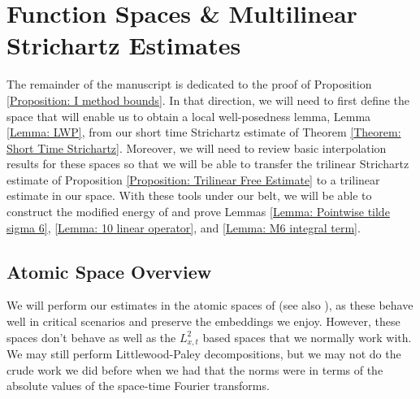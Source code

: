 \documentclass[12pt, letterpaper]{amsart}
\begin{document}
\section{Function Spaces \& Multilinear Strichartz Estimates}\label{Section: I-Method Setup & Function Spaces}
The remainder of the manuscript is dedicated to the proof of Proposition \ref{Proposition: I method bounds}. In that direction, we will need to first define the space that will enable us to obtain a local well-posedness lemma, Lemma \ref{Lemma: LWP}, from our short time Strichartz estimate of Theorem \ref{Theorem: Short Time Strichartz}. Moreover, we will need to review basic interpolation results for these spaces so that we will be able to transfer the trilinear Strichartz estimate of Proposition \ref{Proposition: Trilinear Free Estimate} to a trilinear estimate in our space. With these tools under our belt, we will be able to construct the modified energy of \cite{schippa2024improved} and prove Lemmas \ref{Lemma: Pointwise tilde sigma 6}, \ref{Lemma: 10 linear operator}, and \ref{Lemma: M6 integral term}.


\subsection{Atomic Space Overview}\label{Section: Atomic Space Overview}

We will perform our estimates in the atomic spaces of \cite{MR2824485} (see also \cite{MR3200335, MR2094851}), as these behave well in critical scenarios and preserve the embeddings we enjoy. However, these spaces don't behave as well as the $L^2_{x,t}$ based spaces that we normally work with. We may still perform Littlewood-Paley decompositions, but we may not do the crude work we did before when we had that the norms were in terms of the absolute values of the space-time Fourier transforms.
\end{document}
